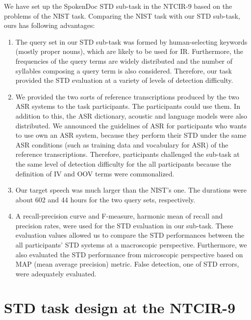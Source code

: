 \documentclass[english]{jnlp_1.4}
\begin{document}
We have set up the SpokenDoc STD sub-task in the NTCIR-9 based on the
problems of the NIST task. Comparing the NIST task with our STD
sub-task, ours has following advantages: 
\begin{enumerate}
\item The query set in our STD sub-task was formed by human-selecting keywords
      (mostly proper nouns), which are likely to be used for IR. 
Furthermore, the frequencies of the query terms are
      widely distributed and the number of syllables composing a query
      term is also considered. Therefore, our task provided the STD
      evaluation at a variety of levels of detection difficulty. 

\item We provided the two sorts of reference transcriptions produced by
      the two ASR systems to the task participants. The participants
      could use them. In addition to this, the ASR dictionary,
      acoustic and language models were also distributed. 
      We announced the guidelines of ASR for participants who wants to 
      use own an ASR system, because they perform their STD under 
      the same ASR conditions (such as training data and vocabulary for ASR) 
      of the reference transcriptions.
      Therefore, participants challenged the sub-task at the same level of
      detection difficulty for the all participants
      because the definition of IV and OOV terms were commonalized. 

\item Our target speech was much larger than the NIST's one. The
      durations were about 602 and 44 hours for the two query sets,
      respectively. 

\item A recall-precision curve and F-measure, harmonic mean of recall
      and precision rates, were used for the STD evaluation in our
      sub-task. These evaluation values allowed us to compare the STD
      performances between the all participants' STD systems at a
      macroscopic perspective. Furthermore, we also evaluated the STD
      performance from microscopic perspective based on MAP (mean
      average precision) metric. False detection, one of STD errors,
      were adequately evaluated. 
\end{enumerate}


\section{STD task design at the NTCIR-9} 
\label{sec:design}
\end{document}

